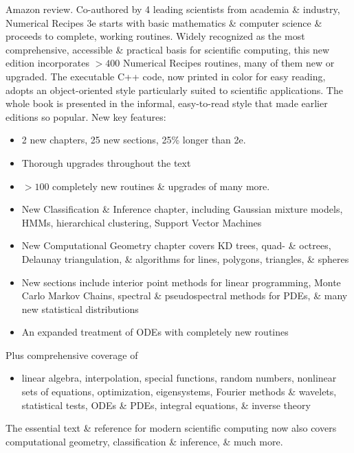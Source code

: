 \documentclass{article}
\begin{document}
\begin{enumerate}
	{\sf Amazon review.} Co-authored by 4 leading scientists from academia \& industry, Numerical Recipes 3e starts with basic mathematics \& computer science \& proceeds to complete, working routines. Widely recognized as the most comprehensive, accessible \& practical basis for scientific computing, this new edition incorporates $> 400$ Numerical Recipes routines, many of them new or upgraded. The executable C++ code, now printed in color for easy reading, adopts an object-oriented style particularly suited to scientific applications. The whole book is presented in the informal, easy-to-read style that made earlier editions so popular. New key features:
	\begin{itemize}
		\item 2 new chapters, 25 new sections, 25\% longer than 2e.
		\item Thorough upgrades throughout the text
		\item $> 100$ completely new routines \& upgrades of many more.
		\item New Classification \& Inference chapter, including Gaussian mixture models, HMMs, hierarchical clustering, Support Vector Machines
		\item New Computational Geometry chapter covers KD trees, quad- \& octrees, Delaunay triangulation, \& algorithms for lines, polygons, triangles, \& spheres
		\item New sections include interior point methods for linear programming, Monte Carlo Markov Chains, spectral \& pseudospectral methods for PDEs, \& many new statistical distributions
		\item An expanded treatment of ODEs with completely new routines
	\end{itemize}
	Plus comprehensive coverage of
	\begin{itemize}
		\item linear algebra, interpolation, special functions, random numbers, nonlinear sets of equations, optimization, eigensystems, Fourier methods \& wavelets, statistical tests, ODEs \& PDEs, integral equations, \& inverse theory
	\end{itemize}
	The essential text \& reference for modern scientific computing now also covers computational geometry, classification \& inference, \& much more.
	

\end{enumerate}
\end{document}

